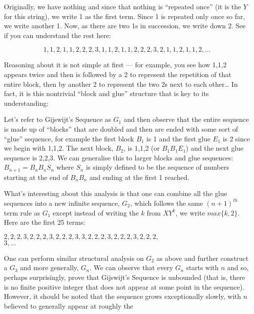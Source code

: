 \documentclass[11pt,a4paper]{report}
\begin{document}
	\begin{multicols}{2}
		
		Originally, we have nothing and since that nothing is “repeated once” (it is the \(Y\) for this string), we write 1 as the first term. Since 1 is repeated only once so far, we write another 1. Now, as there are two 1s in succession, we write down 2. See if you can understand the rest here:\par
		
		\[1, 1, 2, 1, 1, 2, 2, 2, 3, 1, 1, 2, 1, 1, 2, 2, 2, 3, 2, 1, 1, 2, 1, 1, 2, \ldots\]
		
		Reasoning about it is not simple at first --- for example, you see how 1,1,2 appears twice and then is followed by a 2 to represent the repetition of that entire block, then by another 2 to represent the two 2s next to each other… In fact, it is this nontrivial “block and glue” structure that is key to its understanding:\par
		Let’s refer to Gijswijt’s Sequence as \(G_1\) and then observe that the entire sequence is made up of “blocks” that are doubled and then are ended with some sort of “glue” sequence, for example the first block \(B_1\) is 1 and the first glue \(E_1\) is 2 since we begin with 1,1,2. The next block, \(B_2\), is 1,1,2 (or \(B_1B_1E_1\)) and the next glue sequence is 2,2,3. We can generalise this to larger blocks and glue sequences: \(B_{n+1} = B_nB_nS_n\) where \(S_n\) is simply defined to be the sequence of numbers starting at the end of \(B_nB_n\) and ending at the first 1 reached.\par
		What’s interesting about this analysis is that one can combine all the glue sequences into a new infinite sequence, \(G_2\), which follows the same \((n+1)^{th}\) term rule as \(G_1\) except instead of writing the \(k\) from \(XY^k\), we write \(max\{k, 2\}\). Here are the first 25 terms:\par
		
		\(2, 2, 2, 3, 2, 2, 2, 3, 2, 2, 2, 3, 3, 2, 2, 2, 3, 2, 2, 2, 3, 2, 2, 2,\)\\\( 3, \ldots\)
		
		One can perform similar structural analysis on \(G_2\) as above and further construct a \(G_3\) and more generally, \(G_n\). We can observe that every \(G_n\) starts with \(n\) and so, perhaps surprisingly, prove that Gijswijt’s Sequence is unbounded (that is, there is no finite positive integer that does not appear at some point in the sequence). However, it should be noted that the sequence grows exceptionally slowly, with \(n\) believed to generally appear at roughly the\par
		

\end{multicols}
\end{document}

